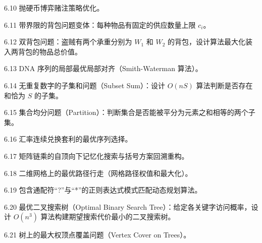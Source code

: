 \begin{exercise}{6.10}
抛硬币博弈赌注策略优化。
\end{exercise}

\begin{exercise}{6.11}
带界限的背包问题变体：每种物品有固定的供应数量上限 $c_i$。
\end{exercise}

\begin{exercise}{6.12}
双背包问题：盗贼有两个承重分别为 $W_1$ 和 $W_2$ 的背包，设计算法最大化装入两背包的物品总价值。
\end{exercise}

\begin{exercise}{6.13}
DNA 序列的局部最优局部对齐（Smith-Waterman 算法）。
\end{exercise}

\begin{exercise}{6.14}
无重复数字的子集和问题（Subset Sum）：设计 $O(nS)$ 算法判断是否存在和恰为 $S$ 的子集。
\end{exercise}

\begin{exercise}{6.15}
集合均分问题（Partition）：判断集合是否能被平分为元素之和相等的两个子集。
\end{exercise}

\begin{exercise}{6.16}
汇率连续兑换套利的最优序列选择。
\end{exercise}

\begin{exercise}{6.17}
矩阵链乘的自顶向下记忆化搜索与括号方案回溯重构。
\end{exercise}

\begin{exercise}{6.18}
二维网格上的最优路径行走（网格路径权值和最大化）。
\end{exercise}

\begin{exercise}{6.19}
包含通配符“?”与“*”的正则表达式模式匹配动态规划算法。
\end{exercise}

\begin{exercise}{6.20}
最优二叉搜索树（Optimal Binary Search Tree）：给定各关键字访问概率，设计 $O(n^3)$ 算法构建期望搜索代价最小的二叉搜索树。
\end{exercise}

\begin{exercise}{6.21}
树上的最大权顶点覆盖问题（Vertex Cover on Trees）。
\end{exercise}

